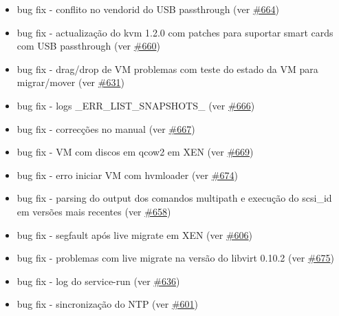 \begin{itemize}
    \item bug fix - conflito no vendorid do USB passthrough (ver \href{https://srcmaster.eurotux.com/pm/p/etva/ticket/664}{\#664})
    \item bug fix - actualização do kvm 1.2.0 com patches para suportar smart cards com USB passthrough (ver \href{https://srcmaster.eurotux.com/pm/p/etva/ticket/660}{\#660})
    \item bug fix - drag/drop de VM problemas com teste do estado da VM para migrar/mover (ver \href{https://srcmaster.eurotux.com/pm/p/etva/ticket/631}{\#631})
    \item bug fix - logs \_ERR\_LIST\_SNAPSHOTS\_ (ver \href{https://srcmaster.eurotux.com/pm/p/etva/ticket/666}{\#666})
    \item bug fix - correcções no manual (ver \href{https://srcmaster.eurotux.com/pm/p/etva/ticket/667}{\#667})
    \item bug fix - VM com discos em qcow2 em XEN (ver \href{https://srcmaster.eurotux.com/pm/p/etva/ticket/669}{\#669})
    \item bug fix - erro iniciar VM com hvmloader (ver \href{https://srcmaster.eurotux.com/pm/p/etva/ticket/674}{\#674})
    \item bug fix - parsing do output dos comandos multipath e execução do scsi\_id em versões mais recentes (ver \href{https://srcmaster.eurotux.com/pm/p/etva/ticket/658}{\#658})
    \item bug fix - segfault após live migrate em XEN (ver \href{https://srcmaster.eurotux.com/pm/p/etva/ticket/606}{\#606})
    \item bug fix - problemas com live migrate na versão do libvirt 0.10.2 (ver \href{https://srcmaster.eurotux.com/pm/p/etva/ticket/675}{\#675})
    \item bug fix - log do service-run (ver \href{https://srcmaster.eurotux.com/pm/p/etva/ticket/636}{\#636})
    \item bug fix - sincronização do NTP (ver \href{https://srcmaster.eurotux.com/pm/p/etva/ticket/601}{\#601})
\end{itemize}

